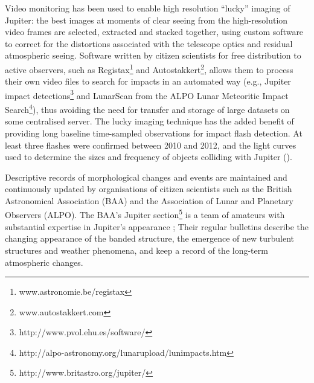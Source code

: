 \documentclass{ar2e}
\begin{document}
Video monitoring has been used to enable high resolution ``lucky'' imaging of
Jupiter: the best images at moments of clear seeing from the high-resolution
video frames are selected, extracted and stacked together, using custom software
to correct for the distortions associated with the telescope optics and residual
atmospheric seeing.  Software written by citizen scientists for free
distribution to active observers, such as
Registax\footnote{www.astronomie.be/registax} and
Autostakkert\footnote{www.autostakkert.com},  allows them to process their own
video files to search for impacts in an automated way (e.g., Jupiter impact
detections\footnote{http://www.pvol.ehu.es/software/} and LunarScan from the
ALPO Lunar Meteoritic Impact
Search\footnote{http://alpo-astronomy.org/lunarupload/lunimpacts.htm}), thus
avoiding the need for transfer and storage of large datasets on some centralised
server. 
%
%
The lucky imaging technique has the added benefit of providing long baseline
time-sampled observations for impact flash detection.   At least three flashes
were confirmed between 2010 and 2012, and the light curves used to determine the
sizes and frequency of objects colliding with Jupiter \citep[e.g.,][]{10hueso}
().  


Descriptive records of morphological changes and events are maintained and
continuously updated by organisations of citizen scientists such as the British
Astronomical Association (BAA) and the Association of Lunar and Planetary
Observers (ALPO). The BAA's Jupiter
section\footnote{http://www.britastro.org/jupiter/} is a team of amateurs with
substantial expertise in Jupiter's appearance \citep{95rogers};  Their regular
bulletins describe the changing appearance of the banded structure, the
emergence of new turbulent structures and weather phenomena, and keep a record
of the long-term atmospheric changes.  
\end{document}
